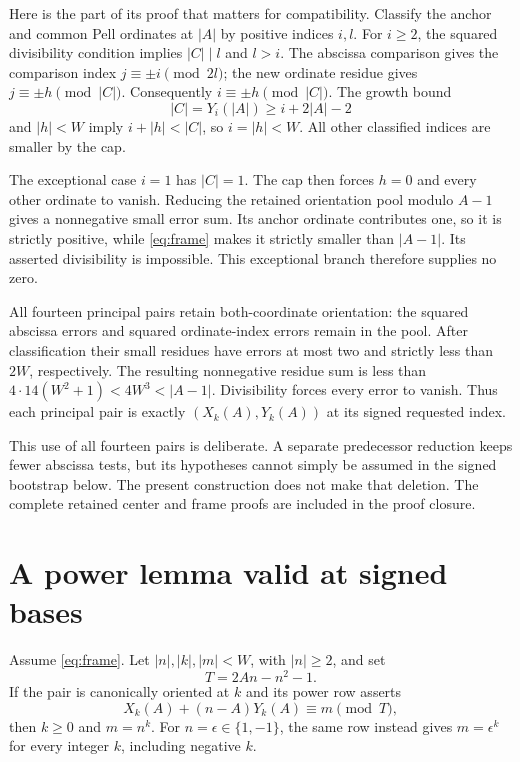 Here is the part of its proof that matters for compatibility. Classify
the anchor and common Pell ordinates at \(|A|\) by positive indices
\(i,l\). For \(i\ge2\), the squared divisibility condition implies
\(|C|\mid l\) and \(l>i\). The abscissa comparison gives the comparison
index \(j\equiv\pm i\pmod{2l}\); the new ordinate residue gives
\(j\equiv\pm h\pmod{|C|}\). Consequently
\(i\equiv\pm h\pmod{|C|}\). The growth bound
\[
 |C|=Y_i(|A|)\ge i+2|A|-2
\]
and \(|h|<W\) imply \(i+|h|<|C|\), so \(i=|h|<W\).
All other classified indices are smaller by the cap.

The exceptional case \(i=1\) has \(|C|=1\). The cap then forces \(h=0\)
and every other ordinate to vanish. Reducing the retained orientation
pool modulo \(A-1\) gives a nonnegative small error sum. Its anchor
ordinate contributes one, so it is strictly positive, while
\eqref{eq:frame} makes it strictly smaller than \(|A-1|\).
Its asserted divisibility is impossible. This exceptional branch
therefore supplies no zero.

All fourteen principal pairs retain both-coordinate orientation:
the squared abscissa errors and squared ordinate-index errors remain
in the pool. After classification their small residues have errors at
most two and strictly less than \(2W\), respectively. The resulting
nonnegative residue sum is less than
\(4\cdot14(W^2+1)<4W^3<|A-1|\). Divisibility forces every error to vanish.
Thus each principal pair is exactly
\((X_k(A),Y_k(A))\) at its signed requested index.

This use of all fourteen pairs is deliberate. A separate predecessor
reduction keeps fewer abscissa tests, but its hypotheses cannot simply
be assumed in the signed bootstrap below. The present construction
does not make that deletion. The complete retained center and frame
proofs are included in the proof closure.

\section{A power lemma valid at signed bases}

\begin{lemma}\label{lem:signed-power}
Assume \eqref{eq:frame}. Let \(|n|,|k|,|m|<W\), with \(|n|\ge2\), and set
\[
 T=2An-n^2-1.
\]
If the pair is canonically oriented at \(k\) and its power row asserts
\[
 X_k(A)+(n-A)Y_k(A)\equiv m\pmod T,
\]
then \(k\ge0\) and \(m=n^k\).
For \(n=\epsilon\in\{1,-1\}\), the same row instead gives
\(m=\epsilon^k\) for every integer \(k\), including negative \(k\).
\end{lemma}

